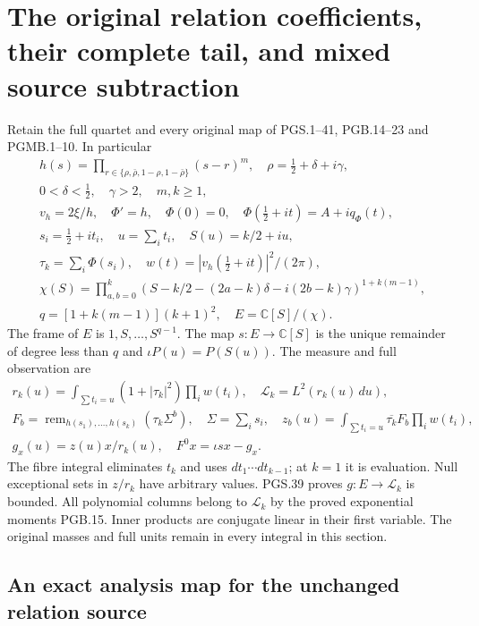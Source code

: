 \section{The original relation coefficients, their complete tail, and mixed source subtraction}
\label{sec:pgrt}

Retain the full quartet and every original map of PGS.1--41,
PGB.14--23 and PGMB.1--10. In particular
\[
\begin{gathered}
 h(s)=\prod_{r\in\{\rho,\bar\rho,1-\rho,1-\bar\rho\}}(s-r)^m,
 \quad \rho=\tfrac12+\delta+i\gamma,\\
 0<\delta<\tfrac12,\quad\gamma>2,\quad m,k\geq1,\\
 v_h=2\xi/h,\quad\Phi'=h,\quad\Phi(0)=0,
 \quad\Phi(\tfrac12+it)=A+iq_\Phi(t),\\
 s_i=\tfrac12+it_i,\quad u=\sum_it_i,\quad S(u)=k/2+iu,\\
 \tau_k=\sum_i\Phi(s_i),\quad w(t)=|v_h(\tfrac12+it)|^2/(2\pi),\\
 \chi(S)=\prod_{a,b=0}^k
 (S-k/2-(2a-k)\delta-i(2b-k)\gamma)^{1+k(m-1)},\\
 q=[1+k(m-1)](k+1)^2,\quad E=\mathbb{C}[S]/(\chi).
\end{gathered}
\tag{PGRT.1}\label{eq:pgrt-original}
\]
The frame of $E$ is $1,S,\ldots,S^{q-1}$. The map $s:E\to\mathbb{C}[S]$
is the unique remainder of degree less than $q$ and $\iota P(u)=P(S(u))$.
The measure and full observation are
\[
\begin{gathered}
 r_k(u)=\int_{\sum t_i=u}(1+|\tau_k|^2)\prod_iw(t_i),
 \quad\mathscr L_k=L^2(r_k(u)\,du),\\
 F_b=\operatorname{rem}_{h(s_1),\ldots,h(s_k)}(\tau_k\Sigma^b),
 \quad \Sigma=\sum_i s_i,\quad
 z_b(u)=\int_{\sum t_i=u}\overline{\tau_k}F_b\prod_iw(t_i),\\
 g_x(u)=z(u)x/r_k(u),\quad F^0x=\iota sx-g_x.
\end{gathered}
\tag{PGRT.2}\label{eq:pgrt-f0}
\]
The fibre integral eliminates $t_k$ and uses $dt_1\cdots dt_{k-1}$;
at $k=1$ it is evaluation. Null exceptional sets in $z/r_k$ have
arbitrary values. PGS.39 proves $g:E\to\mathscr L_k$ is bounded.
All polynomial columns belong to $\mathscr L_k$ by the proved
exponential moments PGB.15. Inner products are conjugate linear
in their first variable. The original masses and full units remain
in every integral in this section.

\subsection{An exact analysis map for the unchanged relation source}


